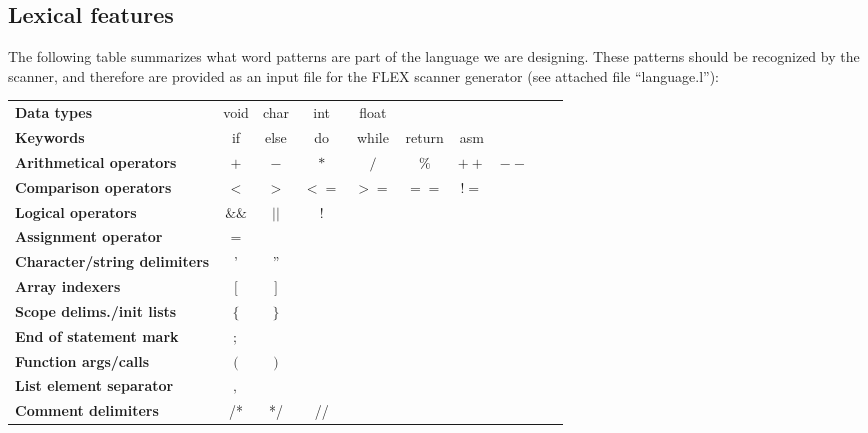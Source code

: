 \subsection{Lexical features}
The following table summarizes what word patterns are part of the language we are designing.
These patterns should be recognized by the scanner, and therefore are provided as an input file
for the FLEX \cite{FLEX} scanner generator (see attached file ``language.l''):

\vspace{0.5cm}
{
\small
\begin{tabular}{lccccccccc}
\textbf{Data types}                      & void & char & int & float &         &      &      &   &   \\
\textbf{Keywords}                        & if   & else & do  & while & return  & asm  &      &   &   \\
\textbf{Arithmetical operators}          & $+$  & $-$  & $*$ & $/$   & $\%$    & $++$ & $--$ &   &   \\
\textbf{Comparison operators}            & $<$  & $>$  & $<=$& $>=$  & $==$    & $!=$ &      &   &   \\
\textbf{Logical operators}               &$\&\&$& $||$ & $!$ &       &         &      &      &   &   \\
\textbf{Assignment operator}             & $=$  &      &     &       &         &      &      &   &   \\
\textbf{Character/string delimiters}     &  '   &  ''  &     &       &         &      &      &   &   \\
\textbf{Array indexers}                  & $[$  & $]$  &     &       &         &      &      &   &   \\
\textbf{Scope delims./init lists}        & $\{$ & $\}$ &     &       &         &      &      &   &   \\
\textbf{End of statement mark}           & $;$  &      &     &       &         &      &      &   &   \\
\textbf{Function args/calls}             & $($  & $)$  &     &       &         &      &      &   &   \\
\textbf{List element separator}          & $,$  &      &     &       &         &      &      &   &   \\
\textbf{Comment delimiters}              & /*   & */   & //  &       &         &      &      &   &   \\
\end{tabular}

}
